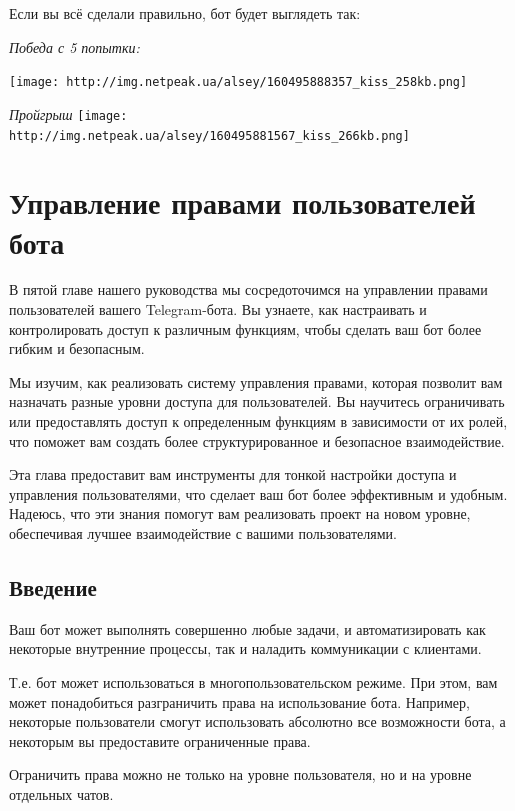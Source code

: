 \documentclass[
]{book}
\begin{document}
Если вы всё сделали правильно, бот будет выглядеть так:

\emph{Победа с 5 попытки:}

\texttt{[image: http://img.netpeak.ua/alsey/160495888357\_kiss\_258kb.png]}

\emph{Пройгрыш}
\texttt{[image: http://img.netpeak.ua/alsey/160495881567\_kiss\_266kb.png]}

\chapter{Управление правами пользователей бота}\label{ux443ux43fux440ux430ux432ux43bux435ux43dux438ux435-ux43fux440ux430ux432ux430ux43cux438-ux43fux43eux43bux44cux437ux43eux432ux430ux442ux435ux43bux435ux439-ux431ux43eux442ux430}

В пятой главе нашего руководства мы сосредоточимся на управлении правами пользователей вашего Telegram-бота. Вы узнаете, как настраивать и контролировать доступ к различным функциям, чтобы сделать ваш бот более гибким и безопасным.

Мы изучим, как реализовать систему управления правами, которая позволит вам назначать разные уровни доступа для пользователей. Вы научитесь ограничивать или предоставлять доступ к определенным функциям в зависимости от их ролей, что поможет вам создать более структурированное и безопасное взаимодействие.

Эта глава предоставит вам инструменты для тонкой настройки доступа и управления пользователями, что сделает ваш бот более эффективным и удобным. Надеюсь, что эти знания помогут вам реализовать проект на новом уровне, обеспечивая лучшее взаимодействие с вашими пользователями.

\section{Введение}\label{ux432ux432ux435ux434ux435ux43dux438ux435-2}

Ваш бот может выполнять совершенно любые задачи, и автоматизировать как некоторые внутренние процессы, так и наладить коммуникации с клиентами.

Т.е. бот может использоваться в многопользовательском режиме. При этом, вам может понадобиться разграничить права на использование бота. Например, некоторые пользователи смогут использовать абсолютно все возможности бота, а некоторым вы предоставите ограниченные права.

Ограничить права можно не только на уровне пользователя, но и на уровне отдельных чатов.
\end{document}
